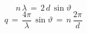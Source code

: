 \documentclass{article}
\begin{document}
\[ n\,\lambda\, =\, 2\,d\,\sin\vartheta \]
\[ q\, =\, \frac{4\pi}{\lambda}\,\sin\vartheta\, =\, n\,\frac{2\pi}{d} \]
\end{document}
